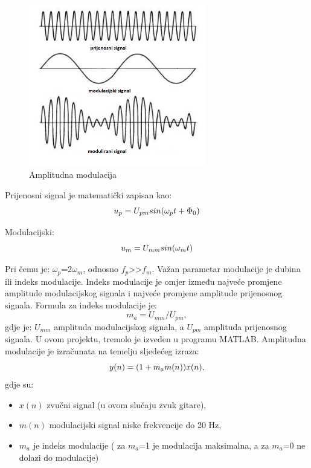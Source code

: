 \documentclass[conference]{IEEEtran}
\begin{document}
 \begin{figure}[H]
   \centerline{\includegraphics[height=200pt]{slike/amplitudna_modulacija.png}}
   \caption{Amplitudna modulacija}
   \label{amp_mod}
 \end{figure}

 Prijenosni signal je matematički zapisan kao:
\begin{equation}
  u_{p} = U_{pm}\*sin(\omega_{p}\*t+\Phi_{0})
  \label{mat_zapis}
\end{equation}

Modulacijski:
\begin{equation}
  u_{m} = U_{mm}\*sin(\omega_{m}\*t)
  \label{mod_zapis}
\end{equation}

Pri čemu je: $\omega_{p}$=2$\omega_{m}$, odnosno $f_{p}$>>$f_{m}$.
Važan parametar modulacije je dubina ili indeks modulacije. Indeks modulacije je omjer između najveće promjene
amplitude modulacijskog signala i najveće promjene amplitude prijenosnog signala. Formula za indeks modulacije je:
\begin{equation}
  m_{a} = U_{mm}/U_{pm},
  \label{indeks_mod}
\end{equation}
gdje je: $U_{mm}$  amplituda modulacijskog signala, a $U_{pm}$ amplituda prijenosnog signala.
U ovom projektu, tremolo je izveden u programu MATLAB. Amplitudna modulacije je izračunata na temelju sljedećeg izraza:
\begin{equation}
  y(n) = (1+ m_{a}\*m(n))\*x(n),
  \label{matlab_mod}
\end{equation}
gdje su:
\begin{itemize}
  \item{$x(n)$ zvučni signal (u ovom slučaju zvuk gitare),}
  \item{$m(n)$ modulacijski signal niske frekvencije do 20 Hz,}
  \item{$m_{a}$ je indeks modulacije ( za $m_{a}$=1 je modulacija maksimalna, a za $m_{a}$=0 ne dolazi do modulacije)}
\end{itemize}
\end{document}
